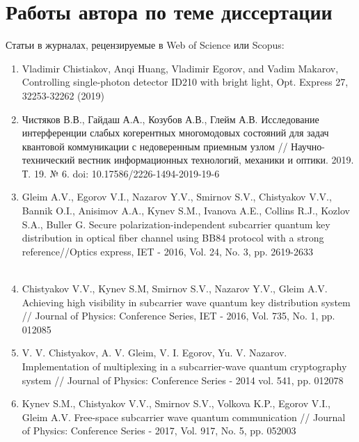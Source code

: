 \section*{Работы автора по теме диссертации}
{Статьи в журналах, рецензируемые в Web of Science или Scopus: }
\begin{enumerate}\addtolength{\itemsep}{-0.5\baselineskip}
\renewcommand{\labelenumi}{[\theenumi]}
\item Vladimir Chistiakov, Anqi Huang, Vladimir Egorov, and Vadim Makarov, Controlling single-photon detector ID210 with bright light, Opt. Express 27, 32253-32262 (2019)
\\
\item Чистяков В.В., Гайдаш А.А., Козубов А.В., Глейм А.В. Исследование интерференции слабых когерентных многомодовых состояний для задач квантовой коммуникации с недоверенным приемным узлом // Научно-технический вестник информационных технологий, механики и оптики. 2019. Т. 19. № 6. doi: 10.17586/2226-1494-2019-19-6
\\
\item    Gleim A.V., Egorov V.I., Nazarov Y.V., Smirnov S.V., Chistyakov V.V., Bannik O.I., Anisimov A.A., Kynev S.M., Ivanova A.E., Collins R.J., Kozlov S.A., Buller G. Secure polarization-independent subcarrier quantum key distribution in optical fiber channel using BB84 protocol with a strong reference//Optics express, IET - 2016, Vol. 24, No. 3, pp. 2619-2633
\\
\\
\item  Chistyakov V.V., Kynev S.M, Smirnov S.V., Nazarov Y.V., Gleim A.V. Achieving high visibility in subcarrier wave quantum key distribution system // Journal of Physics: Conference Series, IET - 2016, Vol. 735, No. 1, pp. 012085
\\
\item V. V. Chistyakov, A. V. Gleim, V. I. Egorov, Yu. V. Nazarov. Implementation of multiplexing in a subcarrier-wave quantum cryptography system // Journal of Physics: Conference Series - 2014  vol. 541,  pp. 012078
\\
\item   Kynev S.M., Chistyakov V.V., Smirnov S.V., Volkova K.P., Egorov V.I., Gleim A.V. Free-space subcarrier wave quantum communication // Journal of Physics: Conference Series - 2017, Vol. 917, No. 5, pp. 052003
\\


\end{enumerate}
